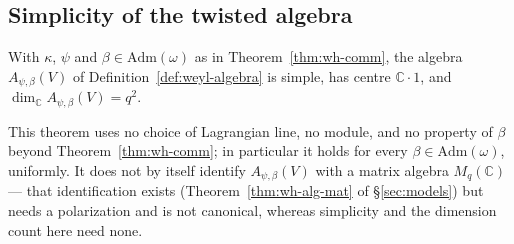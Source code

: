 \subsection{Simplicity of the twisted algebra}

\statusProved
\begin{theorem}
\label{thm:wh-alg}
With $\kappa$, $\psi$ and $\beta \in \mathrm{Adm}(\omega)$ as in
Theorem~\ref{thm:wh-comm}, the algebra $A_{\psi,\beta}(V)$ of
Definition~\ref{def:weyl-algebra} is simple, has centre $\mathbb{C}\cdot 1$,
and $\dim_{\mathbb{C}} A_{\psi,\beta}(V) = q^2$.
\end{theorem}

\begin{scope}
This theorem uses no choice of Lagrangian line, no module, and no property of
$\beta$ beyond Theorem~\ref{thm:wh-comm}; in particular it holds for every
$\beta\in\mathrm{Adm}(\omega)$, uniformly. It does not by itself identify
$A_{\psi,\beta}(V)$ with a matrix algebra $M_q(\mathbb{C})$ — that
identification exists (Theorem~\ref{thm:wh-alg-mat} of
\S\ref{sec:models}) but needs a polarization and is not canonical, whereas
simplicity and the dimension count here need none.
\end{scope}


